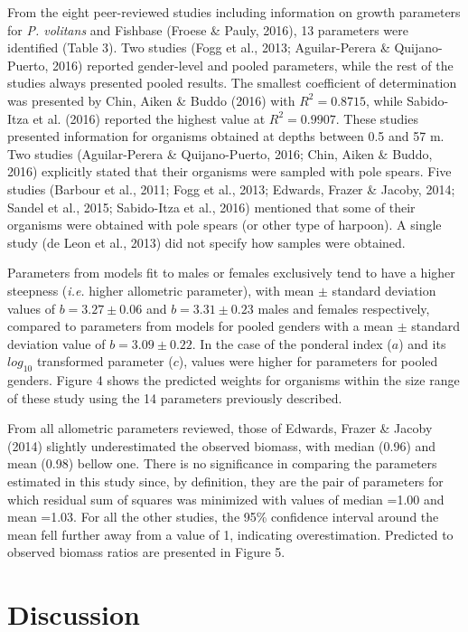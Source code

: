 \documentclass[12pt,]{article}
\begin{document}
From the eight peer-reviewed studies including information on growth
parameters for \emph{P. volitans} and Fishbase (Froese \& Pauly, 2016),
13 parameters were identified (Table 3). Two studies (Fogg et al., 2013;
Aguilar-Perera \& Quijano-Puerto, 2016) reported gender-level and pooled
parameters, while the rest of the studies always presented pooled
results. The smallest coefficient of determination was presented by
Chin, Aiken \& Buddo (2016) with \(R^2 = 0.8715\), while Sabido-Itza et
al. (2016) reported the highest value at \(R^2 = 0.9907\). These studies
presented information for organisms obtained at depths between 0.5 and
57 m. Two studies (Aguilar-Perera \& Quijano-Puerto, 2016; Chin, Aiken
\& Buddo, 2016) explicitly stated that their organisms were sampled with
pole spears. Five studies (Barbour et al., 2011; Fogg et al., 2013;
Edwards, Frazer \& Jacoby, 2014; Sandel et al., 2015; Sabido-Itza et
al., 2016) mentioned that some of their organisms were obtained with
pole spears (or other type of harpoon). A single study (de Leon et al.,
2013) did not specify how samples were obtained.

Parameters from models fit to males or females exclusively tend to have
a higher steepness (\emph{i.e.} higher allometric parameter), with mean
\(\pm\) standard deviation values of \(b = 3.27 \pm 0.06\) and
\(b = 3.31 \pm 0.23\) males and females respectively, compared to
parameters from models for pooled genders with a mean \(\pm\) standard
deviation value of \(b = 3.09 \pm 0.22\). In the case of the ponderal
index (\(a\)) and its \(log_{10}\) transformed parameter (\(c\)), values
were higher for parameters for pooled genders. Figure 4 shows the
predicted weights for organisms within the size range of these study
using the 14 parameters previously described.

From all allometric parameters reviewed, those of Edwards, Frazer \&
Jacoby (2014) slightly underestimated the observed biomass, with median
(0.96) and mean (0.98) bellow one. There is no significance in comparing
the parameters estimated in this study since, by definition, they are
the pair of parameters for which residual sum of squares was minimized
with values of median =1.00 and mean =1.03. For all the other studies,
the 95\% confidence interval around the mean fell further away from a
value of 1, indicating overestimation. Predicted to observed biomass
ratios are presented in Figure 5.

\section{Discussion}\label{discussion}
\end{document}
